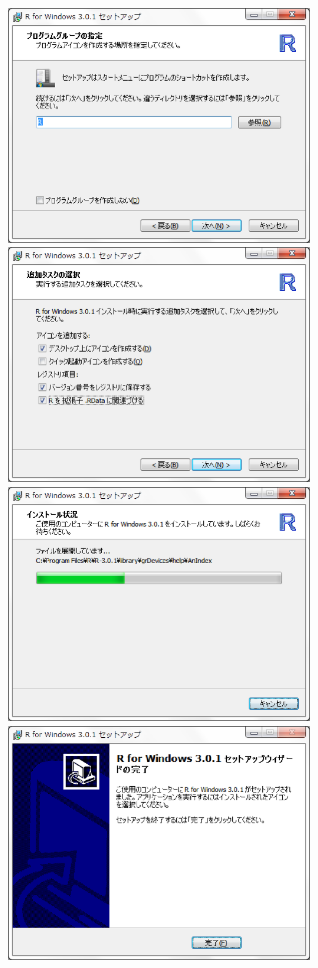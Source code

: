 \documentclass[a4paper,10pt,fleqn]{jarticle}
\begin{document}
\includegraphics[width=8cm]{img/windows/win008.eps}\hspace{0.8em} \includegraphics[width=8cm]{img/windows/win009.eps}\\

\includegraphics[width=8cm]{img/windows/win010.eps}\hspace{0.8em} \includegraphics[width=8cm]{img/windows/win011.eps}\\
\end{document}
